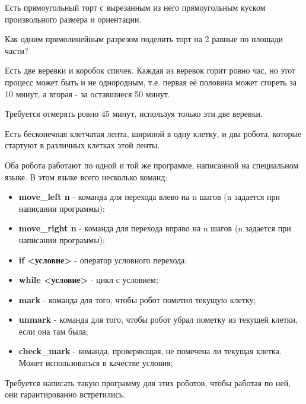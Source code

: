 \begin{problem}

Есть прямоугольный торт с вырезанным из него прямоугольным куском произвольного размера и ориентации.

Как одним прямолинейным разрезом поделить торт на 2 равные по площади части?

\end{problem}
\begin{problem}

Есть две веревки и коробок спичек. Каждая из веревок горит ровно час, но этот процесс может быть и не однородным, т.е. первая её половина может сгореть за 10 минут, а вторая - за оставшиеся 50 минут.

Требуется отмерять ровно 45 минут, используя только эти две веревки.

\end{problem}
\begin{problem}

Есть бесконечная клетчатая лента, шириной в одну клетку, и два робота, которые стартуют в различных клетках этой ленты.

Оба робота работают по одной и той же программе, написанной на специальном языке.
В этом языке всего несколько команд:
\begin{itemize}
\item \textbf{move\_left n} - команда для перехода влево на n шагов (n задается при написании программы);
\item \textbf{move\_right n} - команда для перехода вправо на n шагов (n задается при написании программы);
\item \textbf{if <условие>} - оператор условного перехода;
\item \textbf{while <условие>} - цикл с условием;
\item \textbf{mark} - команда для того, чтобы робот пометил текущую клетку;
\item \textbf{unmark} - команда для того, чтобы робот убрал пометку из текущей клетки, если она там была;
\item \textbf{check\_mark} - команда, проверяющая, не помечена ли текущая клетка. Может использоваться в качестве условия;
\end{itemize}

Требуется написать такую программу для этих роботов, чтобы работая по ней, они гарантированно встретились.

\end{problem}
